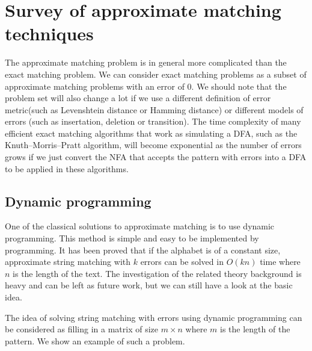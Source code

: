 \section{Survey of approximate matching techniques}
The approximate matching problem is in general more complicated than the exact matching problem. We can consider exact matching problems as a subset of approximate matching problems with an error of 0. We should note that the problem set will also change a lot if we use a different definition of error metric(such as Levenshtein distance or Hamming distance) or different models of errors (such as insertation, deletion or transition). The time complexity of many efficient exact matching algorithms that work as simulating a DFA, such as the Knuth–Morris–Pratt algorithm, will become exponential as the number of errors grows if we just convert the NFA that accepts the pattern with errors into a DFA to be applied in these algorithms. 


\subsection{Dynamic programming}

One of the classical solutions to approximate matching is to use dynamic programming. This method is simple and easy to be implemented by programming. It has been proved that if the alphabet is of a constant size, approximate string matching with $k$ errors can be solved in $O(kn)$ time where $n$ is the length of the text\cite{crochemore-jewels}. The investigation of the related theory background is heavy and can be left as future work, but we can still have a look at the basic idea.

The idea of solving string matching with errors using dynamic programming can be considered as filling in a matrix of size $m\times n$ where $m$ is the length of the pattern. We show an example of such a problem.

